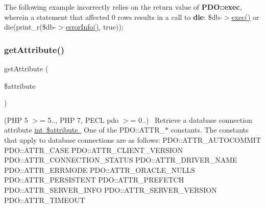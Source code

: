 The following example incorrectly relies on the return value of {\bfseries P\+D\+O\+::exec}, wherein a statement that affected 0 rows results in a call to {\bfseries die}\+: {\ttfamily  \$db-\/$>$\mbox{\hyperlink{interface_pes_1_1_database_1_1_handler_1_1_mini_1_1_p_d_o_interface_aa14a8f8ef2c7ed2b8985d28b336941c9}{exec()}} or die(print\+\_\+r(\$db-\/$>$\mbox{\hyperlink{interface_pes_1_1_database_1_1_handler_1_1_mini_1_1_p_d_o_interface_ac5230ce6cd46c5e922146a441d807877}{error\+Info()}}, true)); } \mbox{\label{interface_pes_1_1_database_1_1_handler_1_1_mini_1_1_p_d_o_interface_ac8ff6f1aa68f8462ac6c3593c8071cc6}} 
\subsubsection{\texorpdfstring{get\+Attribute()}{getAttribute()}}
{\footnotesize\ttfamily get\+Attribute (\begin{DoxyParamCaption}\item[{}]{\$attribute }\end{DoxyParamCaption})}

(P\+HP 5 $>$= 5.., P\+HP 7, P\+E\+CL pdo $>$= 0..)~\newline
 Retrieve a database connection attribute \mbox{\hyperlink{}{int \$attribute }} One of the P\+D\+O\+::\+A\+T\+T\+R\+\_\+$\ast$ constants. The constants that apply to database connections are as follows\+: P\+D\+O\+::\+A\+T\+T\+R\+\_\+\+A\+U\+T\+O\+C\+O\+M\+M\+IT P\+D\+O\+::\+A\+T\+T\+R\+\_\+\+C\+A\+SE P\+D\+O\+::\+A\+T\+T\+R\+\_\+\+C\+L\+I\+E\+N\+T\+\_\+\+V\+E\+R\+S\+I\+ON P\+D\+O\+::\+A\+T\+T\+R\+\_\+\+C\+O\+N\+N\+E\+C\+T\+I\+O\+N\+\_\+\+S\+T\+A\+T\+US P\+D\+O\+::\+A\+T\+T\+R\+\_\+\+D\+R\+I\+V\+E\+R\+\_\+\+N\+A\+ME P\+D\+O\+::\+A\+T\+T\+R\+\_\+\+E\+R\+R\+M\+O\+DE P\+D\+O\+::\+A\+T\+T\+R\+\_\+\+O\+R\+A\+C\+L\+E\+\_\+\+N\+U\+L\+LS P\+D\+O\+::\+A\+T\+T\+R\+\_\+\+P\+E\+R\+S\+I\+S\+T\+E\+NT P\+D\+O\+::\+A\+T\+T\+R\+\_\+\+P\+R\+E\+F\+E\+T\+CH P\+D\+O\+::\+A\+T\+T\+R\+\_\+\+S\+E\+R\+V\+E\+R\+\_\+\+I\+N\+FO P\+D\+O\+::\+A\+T\+T\+R\+\_\+\+S\+E\+R\+V\+E\+R\+\_\+\+V\+E\+R\+S\+I\+ON P\+D\+O\+::\+A\+T\+T\+R\+\_\+\+T\+I\+M\+E\+O\+UT 

